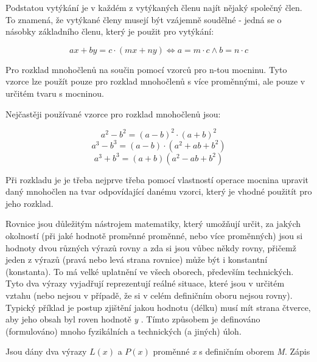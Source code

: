 Podstatou vytýkání je v každém z vytýkaných členu najít nějaký společný člen. To znamená, že vytýkané členy musejí být vzájemně soudělné - jedná se o násobky základního členu, který je použit pro vytýkání:

$$ ax + by = c\cdot (mx + ny) \Leftrightarrow a = m\cdot c \wedge b = n\cdot c $$


Pro rozklad mnohočlenů na součin pomocí vzorců pro n-tou mocninu. Tyto vzorce lze použít pouze pro rozklad mnohočlenů s více proměnnými, ale pouze v určitém tvaru s mocninou.

Nejčastěji používané vzorce pro rozklad mnohočlenů jsou:

$$ a^2 -b^2 = (a-b)^2 \cdot (a+b)^2 $$
$$ a^3 - b^3 = (a-b) \cdot (a^2 + ab +b^2) $$
$$ a^3 + b^3 =(a+b)(a^2-ab+b^2) $$


Při rozkladu je je třeba nejprve třeba pomocí vlastností operace mocnina upravit daný mnohočlen na tvar odpovídající danému vzorci, který je vhodné použitít pro jeho rozklad.











Rovnice jsou důležitým nástrojem matematiky, který umožňují určit, za jakých okolností (při jaké hodnotě proměnné proměnné, nebo více proměnných) jsou si hodnoty dvou různých výrazů rovny a zda si jsou vůbec někdy rovny, přičemž jeden z výrazů (pravá nebo levá strana rovnice) může být i konstantní (konstanta). To má velké uplatnění ve všech oborech, především technických. Tyto dva výrazy vyjadřují reprezentují reálné situace, které jsou v určitém vztahu (nebo nejsou v případě, že si v celém definičním oboru nejsou rovny). Typický příklad je postup zjištění jakou hodnotu (délku) musí mít strana čtverce, aby jeho obsah byl roven hodnotě {\it y} . Tímto způsobem je definováno (formulováno) mnoho fyzikálních a technických (a jiných) úloh. 

Jsou dány dva výrazy $L(x)$ a $P(x)$ proměnné {\it x} s definičním oborem {\it M}. Zápis 

